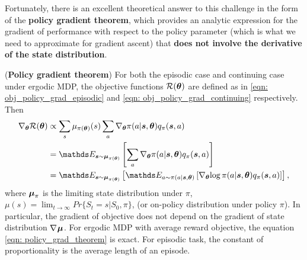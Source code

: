 \documentclass[11pt]{article}
\begin{document}
Fortunately, there is an excellent theoretical answer to this challenge in the form of the \textbf{policy gradient theorem}, which provides an analytic expression for the gradient of performance with respect to the policy parameter (which is what we need to approximate for gradient ascent) that \textbf{does not involve the derivative of the state distribution}.

\begin{theorem} (\textbf{Policy gradient theorem})
For both the episodic case and continuing case under ergodic MDP, the objective functions ${\mathcal R}(\boldsymbol{\theta})$ are defined as in \eqref{eqn: obj_policy_grad_episodic} and \eqref{eqn: obj_policy_grad_continuing} respectively. Then 
\begin{align}
\grad{\mb{\theta}}{\cR(\mb{\theta})} &\propto \sum_{s}\mu_{\pi(\mb{\theta})}(s)\sum_{a}\grad{\mb{\theta}}{\pi(a |\mb{s}, \mb{\theta})}q_{\pi}(\mb{s}, a) \label{eqn: policy_grad_theorem}\\
&= \E{\mb{s} \sim \mb{\mu}_{\pi(\mb{\theta})}}{\sum_{a}\grad{\mb{\theta}}{\pi(a |\mb{s}, \mb{\theta})}q_{\pi}(\mb{s}, a) } \label{eqn: policy_grad_theorem2} \\
&= \E{\mb{s} \sim \mb{\mu}_{\pi(\mb{\theta})}}{\E{a \sim \pi(a|\mb{s}, \mb{\theta})}{\grad{\mb{\theta}}{\log \pi(a |\mb{s}, \mb{\theta})}q_{\pi}(\mb{s}, a) }},\label{eqn: policy_grad_theorem3}
\end{align} where $\boldsymbol{\mu}_{\pi}$ is the limiting state distribution under $\pi$, $\mu(s) = \lim_{t\rightarrow \infty}Pr\{S_{t} = s| S_{0}, \pi\}$, (or on-policy distribution under policy $\pi$).  In particular, the gradient of objective does not depend on the gradient of state distribution $\nabla_{}{\boldsymbol{\mu}}$.  For ergodic MDP with average reward objective, the equation \eqref{eqn: policy_grad_theorem} is exact. For episodic task, the constant of proportionality is the average length of an episode.
\end{theorem}
\end{document}
